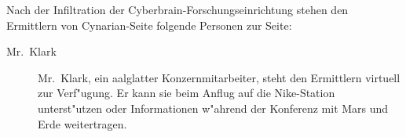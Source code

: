 
Nach der Infiltration der Cyberbrain-Forschungseinrichtung stehen den Ermittlern von Cynarian-Seite folgende Personen zur Seite:

\begin{description}
    \item [Mr.~Klark] Mr.~Klark, ein aalglatter Konzernmitarbeiter, steht den Ermittlern virtuell zur Verf"ugung. Er kann sie beim Anflug auf die Nike-Station unterst"utzen oder Informationen w"ahrend der Konferenz mit Mars und Erde weitertragen.
\end{description}
